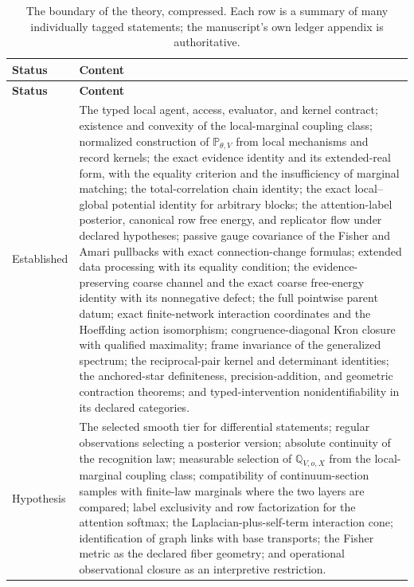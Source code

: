 \documentclass[11pt,letterpaper]{article}
\begin{document}
{\small
\begin{longtable}{>{\raggedright\arraybackslash}p{}>{\raggedright\arraybackslash}p{}}
\caption{The boundary of the theory, compressed. Each row is a summary of many individually tagged statements; the manuscript's own ledger appendix is authoritative.}\label{tab:status}\\
\toprule
\textbf{Status} & \textbf{Content} \\
\midrule
\endfirsthead
\toprule
\textbf{Status} & \textbf{Content} \\
\midrule
\endhead
\bottomrule
\endfoot
\bottomrule
\endlastfoot
Established &
The typed local agent, access, evaluator, and kernel contract; existence and convexity of the local-marginal coupling class; normalized construction of \(\mathbb P_{\theta,V}\) from local mechanisms and record kernels; the exact evidence identity and its extended-real form, with the equality criterion and the insufficiency of marginal matching; the total-correlation chain identity; the exact local--global potential identity for arbitrary blocks; the attention-label posterior, canonical row free energy, and replicator flow under declared hypotheses; passive gauge covariance of the Fisher and Amari pullbacks with exact connection-change formulas; extended data processing with its equality condition; the evidence-preserving coarse channel and the exact coarse free-energy identity with its nonnegative defect; the full pointwise parent datum; exact finite-network interaction coordinates and the Hoeffding action isomorphism; congruence-diagonal Kron closure with qualified maximality; frame invariance of the generalized spectrum; the reciprocal-pair kernel and determinant identities; the anchored-star definiteness, precision-addition, and geometric contraction theorems; and typed-intervention nonidentifiability in its declared categories. \\
\addlinespace
Hypothesis &
The selected smooth tier for differential statements; regular observations selecting a posterior version; absolute continuity of the recognition law; measurable selection of \(\mathbb Q_{V,o,X}\) from the local-marginal coupling class; compatibility of continuum-section samples with finite-law marginals where the two layers are compared; label exclusivity and row factorization for the attention softmax; the Laplacian-plus-self-term interaction cone; identification of graph links with base transports; the Fisher metric as the declared fiber geometry; and operational observational closure as an interpretive restriction. \\

\end{longtable}}
\end{document}
